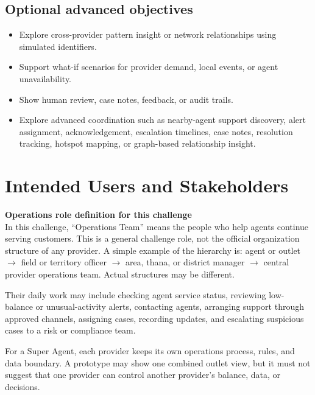 \documentclass[11pt,a4paper]{article}
\begin{document}
\subsection*{Optional advanced objectives}
\begin{itemize}[noitemsep]
    \item Explore cross-provider pattern insight or network relationships using simulated identifiers.
    \item Support what-if scenarios for provider demand, local events, or agent unavailability.
    \item Show human review, case notes, feedback, or audit trails.
    \item Explore advanced coordination such as nearby-agent support discovery, alert assignment, acknowledgement, escalation timelines, case notes, resolution tracking, hotspot mapping, or graph-based relationship insight.
\end{itemize}

\section{Intended Users and Stakeholders}
\textbf{Operations role definition for this challenge}\\
In this challenge, ``Operations Team'' means the people who help agents continue serving customers. This is a general challenge role, not the official organization structure of any provider.
A simple example of the hierarchy is: agent or outlet $\rightarrow$ field or territory officer $\rightarrow$ area, thana, or district manager $\rightarrow$ central provider operations team. Actual structures may be different.

Their daily work may include checking agent service status, reviewing low-balance or unusual-activity alerts, contacting agents, arranging support through approved channels, assigning cases, recording updates, and escalating suspicious cases to a risk or compliance team.

For a Super Agent, each provider keeps its own operations process, rules, and data boundary. A prototype may show one combined outlet view, but it must not suggest that one provider can control another provider's balance, data, or decisions.
\end{document}

